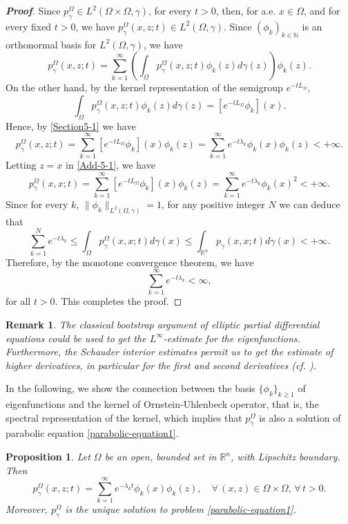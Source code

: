 \documentclass[12pt]{amsart}
\newtheorem{proposition}[theorem]{Proposition}
\newtheorem{remark}[theorem]{Remark}
\newcommand{\R}{\mathbb R}
\newcommand{\N}{\mathbb N}
\newcommand{\1}{\mathbf 1}
\begin{document}
\begin{proof}[\bf Proof]
Since $p^{\Omega}_\gamma\in L^2(\Omega\times \Omega,\gamma)$, for every $t>0$, then, for a.e. $x\in \Omega$, and for every fixed $t>0$, we have $p^{\Omega}_\gamma (x,z;t)\in L^2(\Omega,\gamma)$. Since $(\phi_k)_{k\in \N}$ is an orthonormal basis for $L^2(\Omega,\gamma)$, we have
\[
 p^{\Omega}_\gamma (x,z;t)=\sum^{\infty}_{k=1} \left(\int_\Omega p^{\Omega}_\gamma (x,z;t)\phi_k(z)d\gamma(z) \right) \phi_k(z).
 \]
On the other hand, by the kernel representation of the semigroup $e^{-tL_\Omega}$,
$$
\int_\Omega p^{\Omega}_\gamma (x,z;t)\phi_k(z)d\gamma(z)=[e^{-tL_\Omega}\phi_k ](x).
$$
Hence, by \eqref{Section5-1} we have
\begin{equation}\label{Add-5-1}
 p^{\Omega}_\gamma (x,z;t)=\sum^{\infty}_{k=1}[e^{-tL_\Omega}\phi_k ](x)\phi_k(z)=\sum^{\infty}_{k=1} e^{-t\lambda_k}\phi_k(x) \phi_k(z)<+\infty.
\end{equation}
Letting $z=x$ in \eqref{Add-5-1}, we have
\[
 p^{\Omega}_\gamma (x,x;t)=\sum^{\infty}_{k=1}[e^{-tL_\Omega}\phi_k ](x)\phi_k(z)=\sum^{\infty}_{k=1} e^{-t\lambda_k}\phi_k(x)^2<+\infty.
\]
Since for every $k$, $\| \phi_k\|_{L^2(\Omega,\gamma)}=1$, for any positive integer $N$ we can deduce that
\begin{equation}\label{Add-5-2}
\sum^{N}_{k=1} e^{-t\lambda_k}\leq \int_{\Omega} p^\Omega_\gamma(x,x;t)d\gamma(x)\leq  \int_{\R^n}  p_\gamma (x,x;t)d\gamma(x)<+\infty.
\end{equation}
Therefore, by the monotone convergence theorem, we have
\[
\mathop{\sum}^{\infty}_{k=1}e^{-t\lambda_k}< \infty,
\]
for all $t>0$. This completes the proof.
\end{proof}

\begin{remark}\label{r1} The classical bootstrap argument of elliptic partial differential equations could be used to get the $L^\infty$-estimate for the eigenfunctions. Furthermore, the Schauder interior estimates permit us to get the estimate of higher derivatives, in particular for the first and second derivatives (cf. \cite{Book-Gilbarg-Trudinger}).
\end{remark}

In the following, we show the connection between the basis $\{\phi_k\}_{k\geq 1}$ of eigenfunctions and the kernel of Ornstein-Uhlenbeck operator, that is, the spectral representation of the kernel, which implies that $p^\Omega_\gamma$ is also a solution of parabolic equation \eqref{parabolic-equation1}.

\begin{proposition}\label{p1}
Let $\Omega$ be an open, bounded set in $\R^n$, with Lipschitz boundary. Then
\begin{equation}\label{aggiunta 1000}
p^\Omega_{\gamma}(x,z;t)=\mathop{\sum}_{k=1}^{\infty} e^{-\lambda_k t}\phi_k(x)\phi_k(z),\quad\forall\,(x,z)\in\Omega\times\Omega,\, \forall\, t>0.
\end{equation}
Moreover, $p^\Omega_\gamma$ is the unique solution to problem \eqref{parabolic-equation1}.
\end{proposition}
\end{document}
